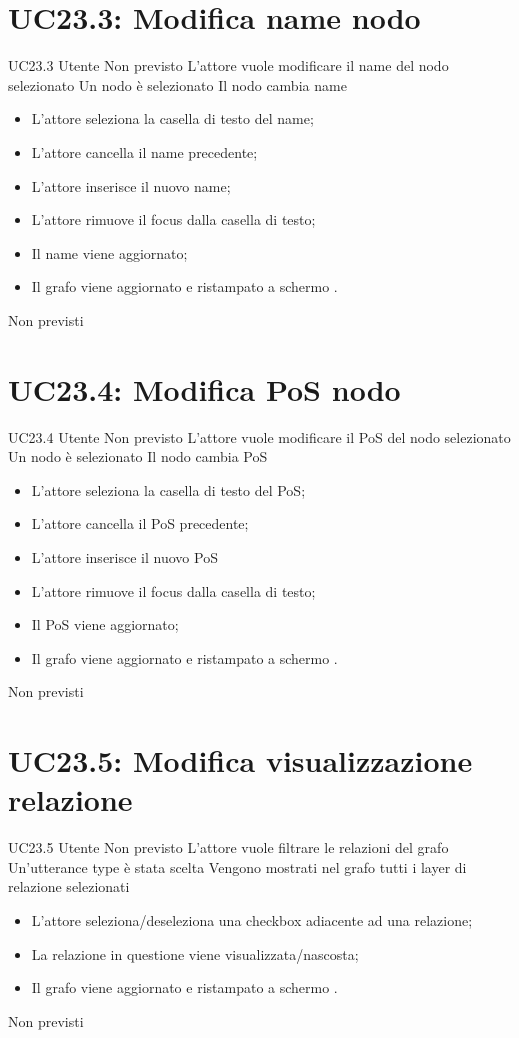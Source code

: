 \documentclass[../AnalisideiRequisiti.tex]{subfiles}
\begin{document}
\section{UC23.3: Modifica name nodo}
\UserCase
{UC23.3}
{Utente}
{Non previsto}
{L'attore vuole modificare il name del nodo selezionato}
{Un nodo è selezionato }
{Il nodo cambia name}
{
	\begin{itemize}
		\item{} L'attore seleziona la casella di testo del name;
		\item{} L'attore cancella il name precedente;
		\item{} L'attore inserisce il nuovo name;
		\item{} L'attore rimuove il focus dalla casella di testo;
		\item{} Il name viene aggiornato;
		\item{} Il grafo viene aggiornato e ristampato a schermo .
	\end{itemize}
}
{Non previsti}

\section{UC23.4: Modifica PoS nodo}
\UserCase
{UC23.4}
{Utente}
{Non previsto}
{L'attore vuole modificare il PoS del nodo selezionato}
{Un nodo è selezionato }
{Il nodo cambia PoS}
{
	\begin{itemize}
		\item{} L'attore seleziona la casella di testo del PoS;
		\item{} L'attore cancella il PoS precedente;
		\item{} L'attore inserisce il nuovo PoS
		\item{} L'attore rimuove il focus dalla casella di testo;
		\item{} Il PoS viene aggiornato;
		\item{} Il grafo viene aggiornato e ristampato a schermo .
	\end{itemize}
}
{Non previsti}

\section{UC23.5: Modifica visualizzazione relazione}
\UserCase
{UC23.5}
{Utente}
{Non previsto}
{L'attore vuole filtrare le relazioni del grafo}
{Un'utterance type è stata scelta }
{Vengono mostrati nel grafo tutti i layer di relazione selezionati}
{
	\begin{itemize}
		\item{} L'attore seleziona/deseleziona una checkbox adiacente ad una relazione;
		\item{} La relazione in questione viene visualizzata/nascosta;
		\item{} Il grafo viene aggiornato e ristampato a schermo .
	\end{itemize}
}
{Non previsti}
\end{document}
